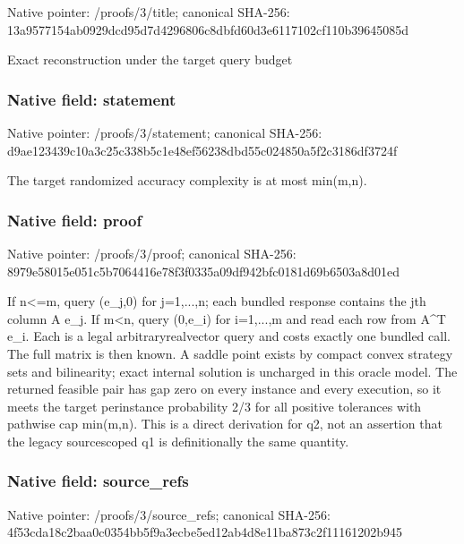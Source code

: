 \documentclass[10pt,a4paper]{article}
\begin{document}
Native pointer: /proofs/3/title; canonical SHA-256: 13a9577154ab0929dcd95d7d\allowbreak{}4296806c8dbfd60d3e611710\allowbreak{}2cf110b39645085d


Exact reconstruction under the target query budget


\subsubsection{Native field: statement}


Native pointer: /proofs/3/statement; canonical SHA-256: d9ae123439c10a3c25c338b5\allowbreak{}c1e48ef56238dbd55c024850\allowbreak{}a5f2c3186df3724f


The target randomized accuracy complexity is at most min(m,n).


\subsubsection{Native field: proof}


Native pointer: /proofs/3/proof; canonical SHA-256: 8979e58015e051c5b7064416\allowbreak{}e78f3f0335a09df942bfc018\allowbreak{}1d69b6503a8d01ed


If n<=m, query (e\_j,0) for j=1,...,n; each bundled response contains the jth column A e\_j. If m<n, query (0,e\_i) for i=1,...,m and read each row from A\textasciicircum{}T e\_i. Each is a legal arbitraryrealvector query and costs exactly one bundled call. The full matrix is then known. A saddle point exists by compact convex strategy sets and bilinearity; exact internal solution is uncharged in this oracle model. The returned feasible pair has gap zero on every instance and every execution, so it meets the target perinstance probability 2/3 for all positive tolerances with pathwise cap min(m,n). This is a direct derivation for q2, not an assertion that the legacy sourcescoped q1 is definitionally the same quantity.


\subsubsection{Native field: source\_refs}


Native pointer: /proofs/3/source\_refs; canonical SHA-256: 4f53cda18c2baa0c0354bb5f\allowbreak{}9a3ecbe5ed12ab4d8e11ba87\allowbreak{}3c2f11161202b945
\end{document}
